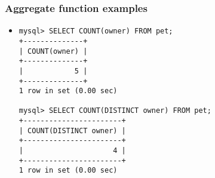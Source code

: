 \documentclass[hyperref={pdfpagelabels=false},svgnames,xcolor=table]{beamer}
\begin{document}
\begin{frame}[fragile]
  \frametitle{Aggregate function examples}
  \begin{itemize}
    \item {\color{blue}{COUNT}}
\begin{verbatim}
mysql> SELECT COUNT(owner) FROM pet;
+--------------+
| COUNT(owner) |
+--------------+
|            5 |
+--------------+
1 row in set (0.00 sec)

mysql> SELECT COUNT(DISTINCT owner) FROM pet;
+-----------------------+
| COUNT(DISTINCT owner) |
+-----------------------+
|                     4 |
+-----------------------+
1 row in set (0.00 sec)

\end{verbatim}
  \end{itemize}
\end{frame}
\end{document}

